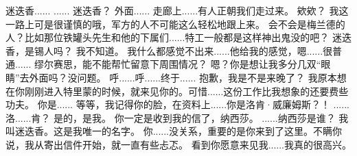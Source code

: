 \documentclass[openany]{book}
\begin{document}
\begin{dialogue}
     迷迭香......
     ......
     迷迭香？
     外面......
     走廊上......有人正朝我们走过来。
     欸欸？
     我这一路上可是很谨慎的哦，军方的人不可能这么轻松地跟上来。
     会不会是梅兰德的人？比如那位铁罐头先生和他的下属们......特工一般都是这样神出鬼没的吧？
     迷迭香，是锡人吗？
     我不知道。
     我什么都感觉不出来......他给我的感觉，嗯......很普通......
     缪尔赛思，能不能帮忙留意下周围情况？
     嗯？你是想让我多分几双“眼睛”去外面吗？没问题。
     呼......呼......终于......
     抱歉，我是不是来晚了？
     我原本想在你刚刚进入特里蒙的时候，就来见你的。可惜......这份工作比我想象的还要费些功夫。
     你是......
     等等，我记得你的脸，在资料上......你是洛肯·威廉姆斯？！
     ......
     洛......肯？
     是的，是我。
     你一定是收到我的信了，纳西莎。
     ......纳西莎是谁？
     我叫迷迭香。这是我唯一的名字。
     你......没关系，重要的是你来到了这里。不瞒你说，我从寄出信件开始，就一直有些忐忑。
     看到你愿意来见我......我真的很高兴。
\end{dialogue}
\end{document}
